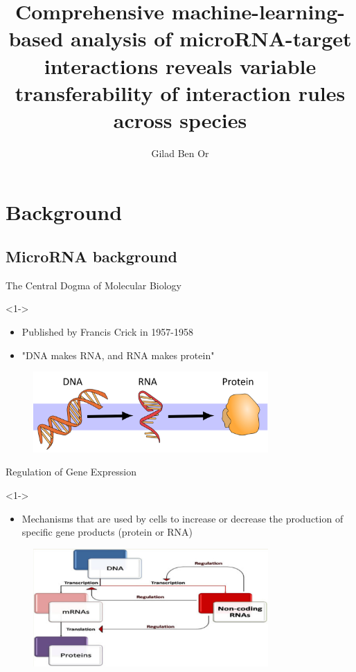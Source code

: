 \documentclass{beamer}
\title[Thesis]{Comprehensive machine-learning-based analysis of microRNA-target interactions reveals variable transferability of interaction rules across species}
\author[A. Author]{Gilad Ben Or}
\begin{document}
	\typesetFrontSlides


\section{Background}

\subsection[Background]{MicroRNA background}

\begin{frame}{The Central Dogma of Molecular Biology}
	\begin{exampleblock}
		<1->{}
		\begin{itemize}
			\item Published by Francis Crick in 1957-1958
			\item "DNA makes RNA, and RNA makes protein"
		\end{itemize}
	\end{exampleblock}
	\begin{figure}[ht!]
		\centering
		\includegraphics[width=0.8\textwidth]{images/dogma.png}
	\end{figure}
\end{frame}

\begin{frame}{Regulation of Gene Expression}
	\begin{exampleblock}
		<1->{}
		\begin{itemize}
			\item Mechanisms that are used by cells to increase or decrease the production of specific gene products (protein or RNA)
		\end{itemize}
	\end{exampleblock}
	\begin{figure}[ht!]
		\centering
		\includegraphics[width=0.8\textwidth]{images/modifieddogma.png}
	\end{figure}
\end{frame}
\end{document}
